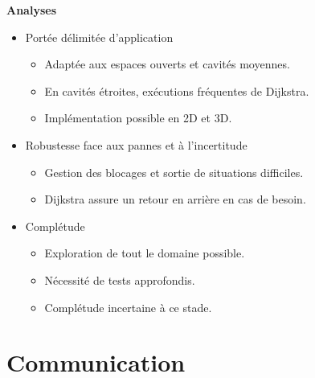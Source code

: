 \documentclass[aspectratio=169,10pt]{beamer}
\begin{document}
\begin{frame}{\textbf{Analyses}}
	\begin{itemize}
		\item Portée délimitée d'application
		\vspace{0.2cm}
		\begin{itemize}
			\item Adaptée aux espaces ouverts et cavités moyennes.
			\item En cavités étroites, exécutions fréquentes de Dijkstra.
			\item Implémentation possible en 2D et 3D.
		\end{itemize}
		\vspace{0.2cm}
		\item Robustesse face aux pannes et à l'incertitude
		\vspace{0.2cm}
		\begin{itemize}
			\item Gestion des blocages et sortie de situations difficiles.
			\item Dijkstra assure un retour en arrière en cas de besoin.
		\end{itemize}
		\vspace{0.2cm}
		\item Complétude
		\vspace{0.2cm}
		\begin{itemize}
			\item Exploration de tout le domaine possible.
			\item Nécessité de tests approfondis.
			\item Complétude incertaine à ce stade.
		\end{itemize}
	\end{itemize}

\end{frame}


\section{Communication}
\end{document}
